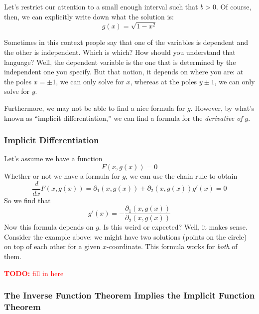\documentclass{article}
\newcommand{\TODO}[1]{\textcolor{red}{\textbf{TODO:} #1}}
\begin{document}
Let's restrict our attention to a small enough interval such that \(b > 0\). Of course, then, we can explicitly write down what the solution is:
\begin{equation}g(x) = \sqrt{1 - x^2}\end{equation}

Sometimes in this context people say that one of the variables is dependent and the other is independent. Which is which? How should you understand that language? Well, the dependent variable is the one that is determined by the independent one you specify. But that notion, it depends on where you are: at the poles \(x = \pm 1\), we can only solve for \(x\), whereas at the poles \(y \pm 1\), we can only solve for \(y\).

Furthermore, we may not be able to find a nice formula for \(g\). However, by what's known as ``implicit differentiation,'' we can find a formula for the \textit{derivative of} \(g\).

\subsubsection{Implicit Differentiation}
Let's assume we have a function
\begin{equation}F(x, g(x)) = 0\end{equation}
Whether or not we have a formula for \(g\), we can use the chain rule to obtain
\begin{equation}\frac{d}{dx}F(x, g(x)) = \partial_1(x, g(x)) + \partial_2(x, g(x))g'(x) = 0\end{equation}
So we find that
\begin{equation}g'(x) = -\frac{\partial_1(x, g(x))}{\partial_2(x, g(x))}\end{equation}
Now this formula depends on \(g\). Is this weird or expected? Well, it makes sense. Consider the example above: we might have two solutions (points on the circle) on top of each other for a given \(x\)-coordinate. This formula works for \textit{both} of them.


\TODO{fill in here}


\subsubsection{The Inverse Function Theorem Implies the Implicit Function Theorem}
\end{document}
